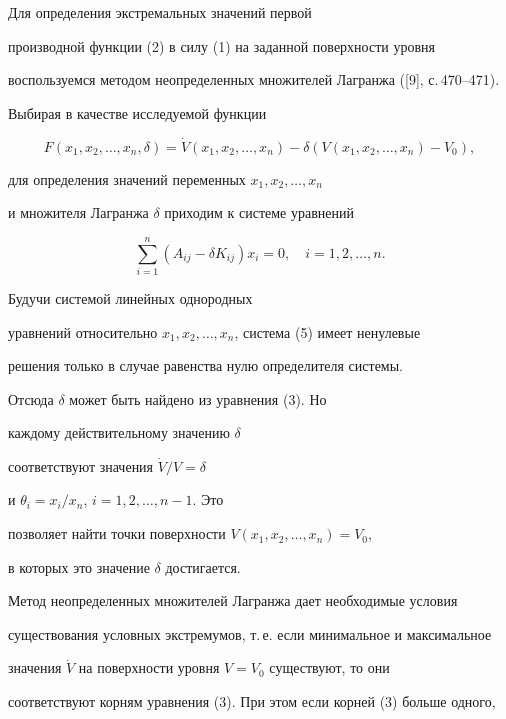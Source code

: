 \begin{pf}


Для определения экстремальных значений первой


производной функции (2) в силу (1) на заданной поверхности уровня


воспользуемся методом неопределенных множителей Лагранжа ([9], с.\,470--471).


Выбирая в качестве исследуемой функции


$$


F(x_{1},x_{2},\dotsc,x_{n},\delta )=\Dot V(x_{1},x_{2},\dotsc,x_{n})-


\delta (V(x_{1},x_{2},\dotsc,x_{n})-V_{0}),


$$


для определения значений переменных $x_{1},x_{2},\dotsc,x_{n}$


и множителя Лагранжа $\delta$ приходим к системе уравнений


\begin{equation}


\sum^n_{i=1}(A_{ij}-\delta K_{ij})x_i=0,\quad i=1,2,\dotsc,n.


\end{equation}


Будучи системой линейных однородных


уравнений относительно $x_{1},x_{2},\dotsc,x_{n}$, система (5) имеет ненулевые


решения только в случае равенства нулю определителя системы.


Отсюда $\delta$ может быть найдено из уравнения (3). Но


каждому действительному значению $\delta$


соответствуют значения $\Dot V/V=\delta$


и $\theta_{i}=x_{i}/x_{n}$, $i=1,2,\dotsc,n-1$. Это


позволяет найти точки поверхности $V(x_{1},x_{2},\dotsc,x_{n})=V_{0}$,


в которых это значение $\delta$ достигается.





Метод неопределенных множителей Лагранжа дает необходимые условия


существования условных экстремумов, т.\,е. если минимальное и максимальное


значения $\Dot V$ на поверхности уровня $V=V_{0}$ существуют, то они


соответствуют корням уравнения (3). При этом если корней (3) больше одного,



\end{pf}

